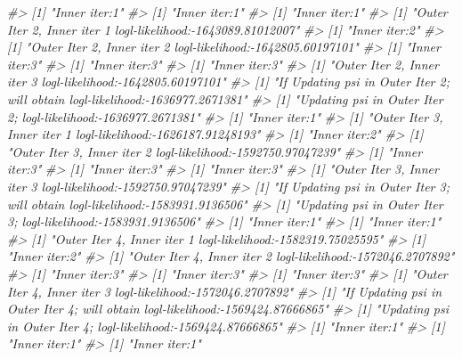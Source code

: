 \documentclass[]{article}
\newcommand{\hlcom}[1]{\textcolor[rgb]{0.502,0.502,0.502}{\textit{#1}}}%
\newenvironment{Shaded}{\begin{myshaded}}{\end{myshaded}}
\newcommand{\CommentTok}[1]{\hlcom{#1}}
\begin{document}
\begin{Shaded}
\begin{Highlighting}[]
\CommentTok{\#\textgreater{} [1] "Inner iter:1"}
\CommentTok{\#\textgreater{} [1] "Inner iter:1"}
\CommentTok{\#\textgreater{} [1] "Inner iter:1"}
\CommentTok{\#\textgreater{} [1] "Outer Iter 2, Inner iter 1 logl{-}likelihood:{-}1643089.81012007"}
\CommentTok{\#\textgreater{} [1] "Inner iter:2"}
\CommentTok{\#\textgreater{} [1] "Outer Iter 2, Inner iter 2 logl{-}likelihood:{-}1642805.60197101"}
\CommentTok{\#\textgreater{} [1] "Inner iter:3"}
\CommentTok{\#\textgreater{} [1] "Inner iter:3"}
\CommentTok{\#\textgreater{} [1] "Inner iter:3"}
\CommentTok{\#\textgreater{} [1] "Outer Iter 2, Inner iter 3 logl{-}likelihood:{-}1642805.60197101"}
\CommentTok{\#\textgreater{} [1] "If Updating psi in Outer Iter 2; will obtain logl{-}likelihood:{-}1636977.2671381"}
\CommentTok{\#\textgreater{} [1] "Updating psi in Outer Iter 2; logl{-}likelihood:{-}1636977.2671381"}
\CommentTok{\#\textgreater{} [1] "Inner iter:1"}
\CommentTok{\#\textgreater{} [1] "Outer Iter 3, Inner iter 1 logl{-}likelihood:{-}1626187.91248193"}
\CommentTok{\#\textgreater{} [1] "Inner iter:2"}
\CommentTok{\#\textgreater{} [1] "Outer Iter 3, Inner iter 2 logl{-}likelihood:{-}1592750.97047239"}
\CommentTok{\#\textgreater{} [1] "Inner iter:3"}
\CommentTok{\#\textgreater{} [1] "Inner iter:3"}
\CommentTok{\#\textgreater{} [1] "Inner iter:3"}
\CommentTok{\#\textgreater{} [1] "Outer Iter 3, Inner iter 3 logl{-}likelihood:{-}1592750.97047239"}
\CommentTok{\#\textgreater{} [1] "If Updating psi in Outer Iter 3; will obtain logl{-}likelihood:{-}1583931.9136506"}
\CommentTok{\#\textgreater{} [1] "Updating psi in Outer Iter 3; logl{-}likelihood:{-}1583931.9136506"}
\CommentTok{\#\textgreater{} [1] "Inner iter:1"}
\CommentTok{\#\textgreater{} [1] "Inner iter:1"}
\CommentTok{\#\textgreater{} [1] "Outer Iter 4, Inner iter 1 logl{-}likelihood:{-}1582319.75025595"}
\CommentTok{\#\textgreater{} [1] "Inner iter:2"}
\CommentTok{\#\textgreater{} [1] "Outer Iter 4, Inner iter 2 logl{-}likelihood:{-}1572046.2707892"}
\CommentTok{\#\textgreater{} [1] "Inner iter:3"}
\CommentTok{\#\textgreater{} [1] "Inner iter:3"}
\CommentTok{\#\textgreater{} [1] "Inner iter:3"}
\CommentTok{\#\textgreater{} [1] "Outer Iter 4, Inner iter 3 logl{-}likelihood:{-}1572046.2707892"}
\CommentTok{\#\textgreater{} [1] "If Updating psi in Outer Iter 4; will obtain logl{-}likelihood:{-}1569424.87666865"}
\CommentTok{\#\textgreater{} [1] "Updating psi in Outer Iter 4; logl{-}likelihood:{-}1569424.87666865"}
\CommentTok{\#\textgreater{} [1] "Inner iter:1"}
\CommentTok{\#\textgreater{} [1] "Inner iter:1"}
\CommentTok{\#\textgreater{} [1] "Inner iter:1"}

\end{Highlighting}
\end{Shaded}
\end{document}
